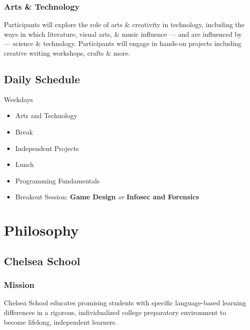 \documentclass[letterpaper,10pt,english]{sphinxmanual}
\begin{document}
\subsection{Arts \& Technology}
\label{description:arts-technology}
Participants will explore the role of arts \& creativity in technology, including the ways in which literature, visual arts, \& music influence — and are influenced by — science \& technology. Participants will engage in hands-on projects including creative writing workshops, crafts \& more.


\section{Daily Schedule}
\label{description:daily-schedule}
Weekdays
\begin{itemize}
\item {} 
Arts and Technology

\item {} 
Break

\item {} 
Independent Projects

\item {} 
Lunch

\item {} 
Programming Fundamentals

\item {} 
Breakout Session: \textbf{Game Design} \emph{or} \textbf{Infosec and Forensics}

\end{itemize}


\chapter{Philosophy}
\label{philosophy::doc}\label{philosophy:philosophy}\label{philosophy:index-0}

\section{Chelsea School}
\label{philosophy:chelsea-school}

\subsection{Mission}
\label{philosophy:mission}
Chelsea School educates promising students with specific language-based learning differences in a rigorous, individualized college preparatory environment to become lifelong, independent learners.
\end{document}
